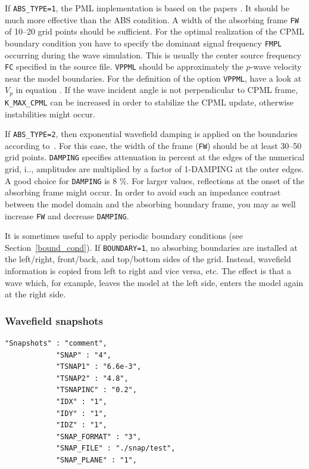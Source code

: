 \documentclass[11pt,onecolumn,oneside]{article}
\newcommand{\option}[1]{\texttt{#1}}
\begin{document}
If \option{ABS\_TYPE=1}, the PML implementation is based on the papers
\cite{collino:01,komatitsch:07,martin:09}. It should be
much more effective than the ABS condition. A width of the absorbing frame
\option{FW} of 10--20 grid points should be sufficient. For the optimal
realization of the CPML boundary condition you have to specify the dominant
signal frequency \option{FMPL} occurring during the wave simulation. This is
usually the center source frequency \option{FC} specified in the source file.
\option{VPPML} should be approximately the $p$-wave velocity near the model
boundaries. For the definition of the option \option{VPPML}, have a look at
$V_p$ in equation . If the wave incident angle is not perpendicular
to CPML frame, \option{K\_MAX\_CPML} can be increased in order to stabilize the
CPML update, otherwise instabilities might occur.

If \option{ABS\_TYPE=2}, then exponential wavefield damping is applied on the
boundaries according to~\cite{cerjan:85}. For this case, the width of the frame
(\option{FW}) should be at least 30--50 grid points. \option{DAMPING} specifies
attenuation in percent at the edges of the numerical grid, i.\e., amplitudes
are multiplied by a factor of 1-DAMPING at the outer edges. A good choice for
\option{DAMPING} is 8 \%. For larger values, reflections at the onset of the
absorbing frame might occur. In order to avoid such an impedance contrast
between the model domain and the absorbing boundary frame, you may as well
increase \option{FW} and decrease \option{DAMPING}.

It is sometimes useful to apply periodic boundary conditions (see
Section~\ref{bound_cond}). If \texttt{BOUNDARY=1}, no absorbing boundaries are
installed at the left/right, front/back, and top/bottom sides of the grid.
Instead, wavefield information is copied from left to right and vice versa,
etc. The effect is that a wave which, for example, leaves the model at the left
side, enters the model again at the right side.

\subsubsection{Wavefield snapshots}
\begin{verbatim}
"Snapshots" : "comment",
            "SNAP" : "4",
            "TSNAP1" : "6.6e-3",
            "TSNAP2" : "4.8",
            "TSNAPINC" : "0.2",
            "IDX" : "1",
            "IDY" : "1",
            "IDZ" : "1",
            "SNAP_FORMAT" : "3",
            "SNAP_FILE" : "./snap/test",
            "SNAP_PLANE" : "1",
\end{verbatim}
\end{document}
